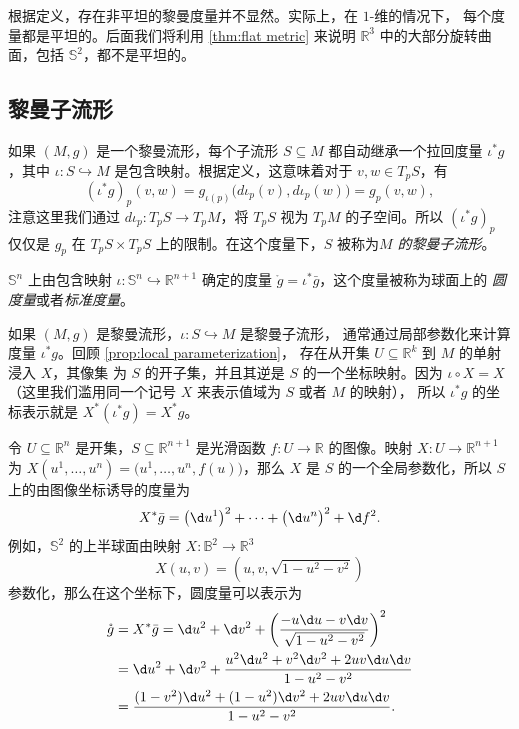 根据定义，存在非平坦的黎曼度量并不显然。实际上，在 $1$-维的情况下，
每个度量都是平坦的。后面我们将利用 \autoref{thm:flat metric}
来说明 $\mathbb R^3$ 中的大部分旋转曲面，包括 $\mathbb S^2$，都不是平坦的。


\subsection{黎曼子流形}

如果 $(M,g)$ 是一个黎曼流形，每个子流形 $S\subseteq M$
都自动继承一个拉回度量 $\iota^*g$，其中 $\iota:S\hookrightarrow M$
是包含映射。根据定义，这意味着对于 $v,w\in T_pS$，有
\[
  (\iota^*g)_p(v,w)=g_{\iota(p)}\bigl(d\iota_p(v),d\iota_p(w)\bigr)
  =g_p(v,w),
\]
注意这里我们通过 $d\iota_p:T_pS\to T_pM$，将 $T_pS$ 视为 $T_pM$
的子空间。所以 $(\iota^*g)_p$ 仅仅是 $g_p$ 在 $T_pS\times T_pS$
上的限制。在这个度量下，$S$ 被称为\emph{$M$ 的黎曼子流形}。

\begin{example}
  $\mathbb{S}^n$ 上由包含映射 $\iota:\mathbb{S}^n\hookrightarrow \mathbb{R}^{n+1}$
  确定的度量 $\mathring{g}=\iota^*\bar g$，这个度量被称为球面上的
  \emph{圆度量}或者\emph{标准度量}。
\end{example}

如果 $(M,g)$ 是黎曼流形，$\iota:S\hookrightarrow M$ 是黎曼子流形，
通常通过局部参数化来计算度量 $\iota^*g$。回顾 \autoref{prop:local parameterization}，
存在从开集 $U\subseteq \mathbb{R}^k$ 到 $M$ 的单射浸入 $X$，其像集
为 $S$ 的开子集，并且其逆是 $S$ 的一个坐标映射。因为 $\iota\circ X=X$
（这里我们滥用同一个记号 $X$ 来表示值域为 $S$ 或者 $M$ 的映射），
所以 $\iota^*g$ 的坐标表示就是 $X^*(\iota^*g)=X^*g$。

\begin{example}[图像坐标中的度量]
  令 $U\subseteq \mathbb{R}^n$ 是开集，$S\subseteq \mathbb{R}^{n+1}$
  是光滑函数 $f:U\to \mathbb{R}$ 的图像。映射 $X:U\to \mathbb{R}^{n+1}$
  为 $X(u^1,\dots,u^n)=\bigl(u^1,\dots,u^n,f(u)\bigr)$，那么 $X$
  是 $S$ 的一个全局参数化，所以 $S$ 上的由图像坐标诱导的度量为
  \[
    X^*\bar g=\bigl(\d u^1\bigr)^2+\cdots+\bigl(\d u^n\bigr)^2+\d f^2.
  \]
  例如，$\mathbb{S}^2$ 的上半球面由映射 $X:\mathbb{B}^2\to \mathbb{R}^3$
  \[
    X(u,v)=\left(u,v,\sqrt{1-u^2-v^2}\right)  
  \]
  参数化，那么在这个坐标下，圆度量可以表示为
  \begin{align*}
    \mathring{g}&=X^*\bar g=\d u^2+\d v^2+\left(\frac{-u\d u-v\d v}{\sqrt{1-u^2-v^2}}\right)^2\\
    &=\d u^2+\d v^2+\frac{u^2\d u^2+v^2\d v^2+2uv\d u\d v}{1-u^2-v^2}\\
    &=\frac{(1-v^2)\d u^2+(1-u^2)\d v^2+2uv\d u\d v}{1-u^2-v^2}.
  \end{align*}
\end{example}

